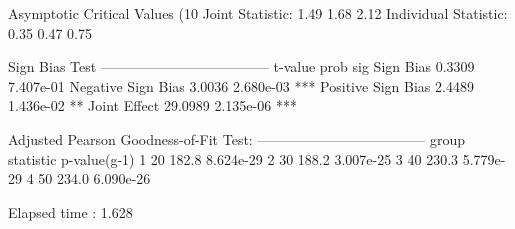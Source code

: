 \begin{Schunk}
\begin{Soutput}
Asymptotic Critical Values (10%
Joint Statistic:         1.49 1.68 2.12
Individual Statistic:    0.35 0.47 0.75

Sign Bias Test
------------------------------------
                   t-value      prob sig
Sign Bias           0.3309 7.407e-01
Negative Sign Bias  3.0036 2.680e-03 ***
Positive Sign Bias  2.4489 1.436e-02  **
Joint Effect       29.0989 2.135e-06 ***


Adjusted Pearson Goodness-of-Fit Test:
------------------------------------
  group statistic p-value(g-1)
1    20     182.8    8.624e-29
2    30     188.2    3.007e-25
3    40     230.3    5.779e-29
4    50     234.0    6.090e-26


Elapsed time : 1.628
\end{Soutput}
\end{Schunk}

